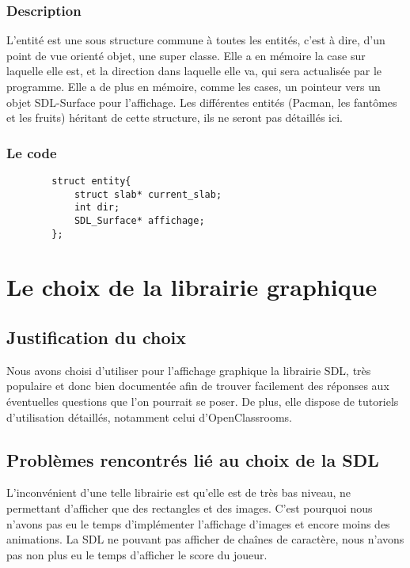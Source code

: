 \documentclass[a4paper,11pt]{article}
\begin{document}
    \subsubsection{Description}

    L'entité est une sous structure commune à toutes les entités, c'est à dire, d'un point de vue orienté objet, une super classe. Elle a en mémoire la case sur laquelle elle est, et la direction dans laquelle elle va, qui sera actualisée par le programme. Elle a de plus en mémoire, comme les cases, un pointeur vers un objet SDL-Surface pour l'affichage. Les différentes entités (Pacman, les fantômes et les fruits) héritant de cette structure, ils ne seront pas détaillés ici.

    \subsubsection{Le code}

    \begin{verbatim}
        struct entity{
            struct slab* current_slab;
            int dir;
            SDL_Surface* affichage;
        };
    \end{verbatim}

\section{Le choix de la librairie graphique}

    \subsection{Justification du choix}
    
    Nous avons choisi d'utiliser pour l'affichage graphique la librairie SDL, très populaire et donc bien documentée afin de trouver facilement des réponses aux éventuelles questions que l'on pourrait se poser. De plus, elle dispose de tutoriels d'utilisation détaillés, notamment celui d'OpenClassrooms.

    \subsection{Problèmes rencontrés lié au choix de la SDL}
    
    L'inconvénient d'une telle librairie est qu'elle est de très bas niveau, ne permettant d'afficher que des rectangles et des images. C'est pourquoi nous n'avons pas eu le temps d'implémenter l'affichage d'images et encore moins des animations. La SDL ne pouvant pas afficher de chaînes de caractère, nous n'avons pas non plus eu le temps d'afficher le score du joueur.
\end{document}

